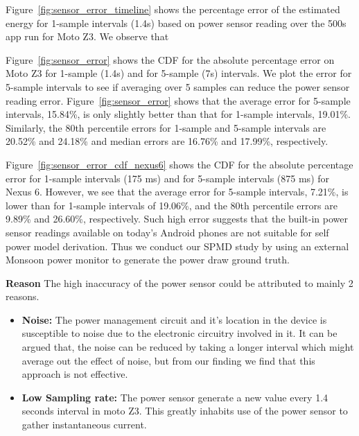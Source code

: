  

Figure~\ref{fig:sensor_error_timeline} shows the percentage error of the estimated energy
for 1-sample intervals (1.4s) based on power sensor reading over the 500s app run for Moto Z3.
We observe that 
\fi

Figure~\ref{fig:sensor_error} shows the CDF for the absolute
percentage error on Moto Z3 for 1-sample (1.4s) and for 5-sample (7s)
intervals.  We plot the error for 5-sample intervals to see if
averaging over 5 samples can reduce the power sensor reading error.
Figure~\ref{fig:sensor_error} shows
that the average error for 5-sample intervals, 15.84\%,
is only slightly better than that for 1-sample intervals, 19.01\%.
Similarly, the 80th percentile errors for 1-sample and 5-sample intervals
are 20.52\% and 24.18\% and median errors are 
16.76\% and 17.99\%, respectively.

Figure~\ref{fig:sensor_error_cdf_nexus6} shows the CDF for the absolute percentage error
for 1-sample intervals (175 ms) and for 5-sample intervals (875 ms) for Nexus 6.
However, we see that the average error for 5-sample intervals, 7.21\%,
is lower than for 1-sample intervals of 19.06\%, and
the 80th percentile errors are 9.89\% and 26.60\%, respectively.
\fi
Such high error 
suggests that the built-in power sensor readings available on today's Android phones 
are not suitable for self power model derivation. 
Thus we conduct our SPMD study by using an external
Monsoon power monitor to generate the power draw ground truth.

{\bf Reason }
The high inaccuracy of the power sensor could be attributed to mainly 2 reasons.
\begin{itemize}
    \item {\bf Noise: } The power management circuit and it's location in the device is susceptible to noise due to the electronic circuitry involved in it.
    It can be argued that, the noise can be reduced by taking a longer interval which might average out the effect of noise, but from our finding we find that this approach is not effective.
    
    \item {\bf Low Sampling rate: } The power sensor generate a new value every 1.4 seconds interval in moto Z3.
    This greatly inhabits use of the power sensor to gather instantaneous current. 
 \end{itemize}
\fi


